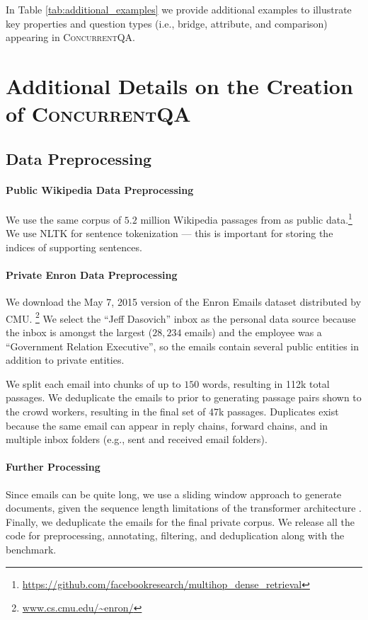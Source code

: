 \documentclass{article}
\renewcommand\cite{\citep}	\newcommand\shortcite{\citeyearpar}\newcommand\newcite{\citet}
\newcommand{\datasetname}{\textsc{ConcurrentQA}\xspace}
\begin{document}
In Table \ref{tab:additional_examples} we provide additional examples to illustrate key properties and question types (i.e., bridge, attribute, and comparison) appearing in \datasetname.




 \section{Additional Details on the Creation of \datasetname }
\subsection{Data Preprocessing}
\paragraph{Public Wikipedia Data Preprocessing} We use the same corpus of $5.2$ million Wikipedia passages from \citet{xiong2021mdr} as public data.\footnote{\url{https://github.com/facebookresearch/multihop\_dense\_retrieval}}
We use NLTK \cite{bird2009nltk} for sentence tokenization --- this is important for storing the indices of supporting sentences. 


\paragraph{Private Enron Data Preprocessing}
We download the May 7, 2015 version of the Enron Emails dataset distributed by CMU. \footnote{\url{www.cs.cmu.edu/~enron/}} We select the ``Jeff Dasovich'' inbox as the personal data source because the inbox is amongst the largest ($28,234$ emails) and the employee was a ``Government Relation Executive'', so the emails contain several public entities in addition to private entities. 

We split each email into chunks of up to $150$ words, resulting in 112k total passages. We deduplicate the emails to prior to generating passage pairs shown to the crowd workers, resulting in the final set of 47k passages. Duplicates exist because the same email can appear in reply chains, forward chains, and in multiple inbox folders (e.g., sent and received email folders).

\paragraph{Further Processing} Since emails can be quite long, we use a sliding window approach to generate documents, given the sequence length limitations of the transformer architecture \cite{alberti2019bertnq}. Finally, we deduplicate the emails for the final private corpus. We release all the code for preprocessing, annotating, filtering, and deduplication along with the benchmark.
\end{document}
